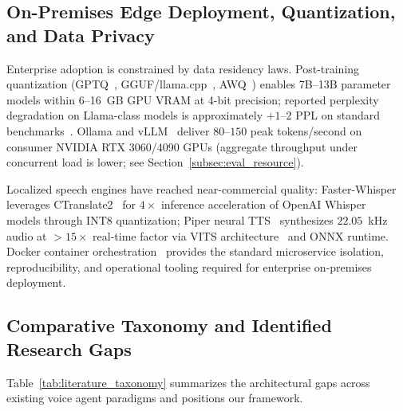 \documentclass[11pt,a4paper]{article}
\begin{document}
\subsection{On-Premises Edge Deployment, Quantization, and Data Privacy}
\label{subsec:rw_edge}

Enterprise adoption is constrained by data residency laws. Post-training quantization (GPTQ~\cite{frantar2022gptq}, GGUF/llama.cpp~\cite{gerganov2023llamacpp}, AWQ~\cite{lin2023awq}) enables 7B--13B parameter models within 6--16~GB GPU VRAM at 4-bit precision; reported perplexity degradation on Llama-class models is approximately $+1$--$2$ PPL on standard benchmarks~\cite{frantar2022gptq}. Ollama and vLLM~\cite{kwon2023vllm} deliver $80$--$150$ peak tokens/second on consumer NVIDIA RTX 3060/4090 GPUs (aggregate throughput under concurrent load is lower; see Section~\ref{subsec:eval_resource}).

Localized speech engines have reached near-commercial quality: Faster-Whisper~\cite{fasterwhisper2023} leverages CTranslate2~\cite{kleymyuk2021ctranslate2} for $4\times$ inference acceleration of OpenAI Whisper~\cite{radford2022whisper} models through INT8 quantization; Piper neural TTS~\cite{piper2023tts} synthesizes $22.05$~kHz audio at $>15\times$ real-time factor via VITS architecture~\cite{kim2021vits} and ONNX runtime. Docker container orchestration~\cite{merkel2014docker} provides the standard microservice isolation, reproducibility, and operational tooling required for enterprise on-premises deployment.

\subsection{Comparative Taxonomy and Identified Research Gaps}
\label{subsec:rw_gaps}

Table~\ref{tab:literature_taxonomy} summarizes the architectural gaps across existing voice agent paradigms and positions our framework.
\end{document}

